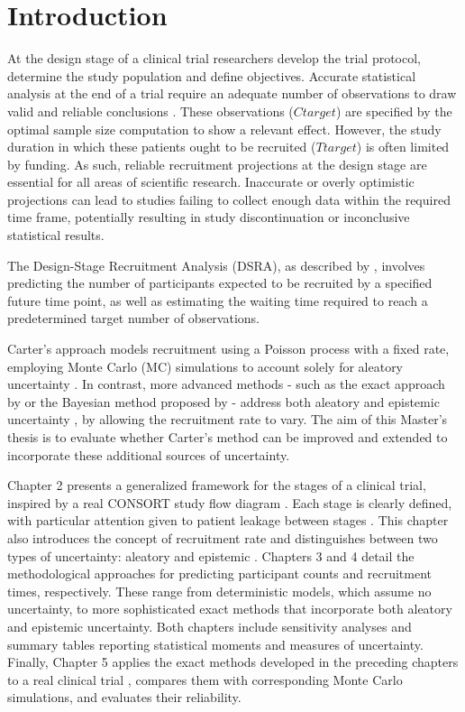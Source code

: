 


\chapter{Introduction}

At the design stage of a clinical trial researchers develop the trial protocol, determine the study population and define objectives. Accurate statistical analysis at the end of a trial require an adequate number of observations to draw valid and reliable conclusions \citep{panos2023statistical}. These observations ($Ctarget$) are specified by the optimal sample size computation to show a relevant effect. However, the study duration in which these patients ought to be recruited ($Ttarget$) is often limited by funding. As such, reliable recruitment projections at the design stage are essential for all areas of scientific research. Inaccurate or overly optimistic projections can lead to studies failing to collect enough data within the required time frame, potentially resulting in study discontinuation or inconclusive statistical results.

The Design-Stage Recruitment Analysis (DSRA), as described by \cite{carter2004application}, involves predicting the number of participants expected to be recruited by a specified future time point, as well as estimating the waiting time required to reach a predetermined target number of observations.

Carter's approach models recruitment using a Poisson process with a fixed rate, employing Monte Carlo (MC) simulations to account solely for aleatory uncertainty \citep{ohagan2006}. In contrast, more advanced methods - such as the exact approach by \cite{anisimov2007modelling} or the Bayesian method proposed by \cite{bagiella2001predicting} - address both aleatory and epistemic uncertainty \citep{ohagan2006}, by allowing the recruitment rate to vary. The aim of this Master's thesis is to evaluate whether Carter's method can be improved and extended to incorporate these additional sources of uncertainty.

Chapter 2 presents a generalized framework for the stages of a clinical trial, inspired by a real CONSORT study flow diagram \citep{schulz2010consort}. Each stage is clearly defined, with particular attention given to patient leakage between stages \citep{desai2014preventing}. This chapter also introduces the concept of recruitment rate and distinguishes between two types of uncertainty: aleatory and epistemic \citep{ohagan2006}. Chapters 3 and 4 detail the methodological approaches for predicting participant counts and recruitment times, respectively. These range from deterministic models, which assume no uncertainty, to more sophisticated exact methods that incorporate both aleatory and epistemic uncertainty. Both chapters include sensitivity analyses and summary tables reporting statistical moments and measures of uncertainty. Finally, Chapter 5 applies the exact methods developed in the preceding chapters to a real clinical trial \citep{carter2004application}, compares them with corresponding Monte Carlo simulations, and evaluates their reliability.

